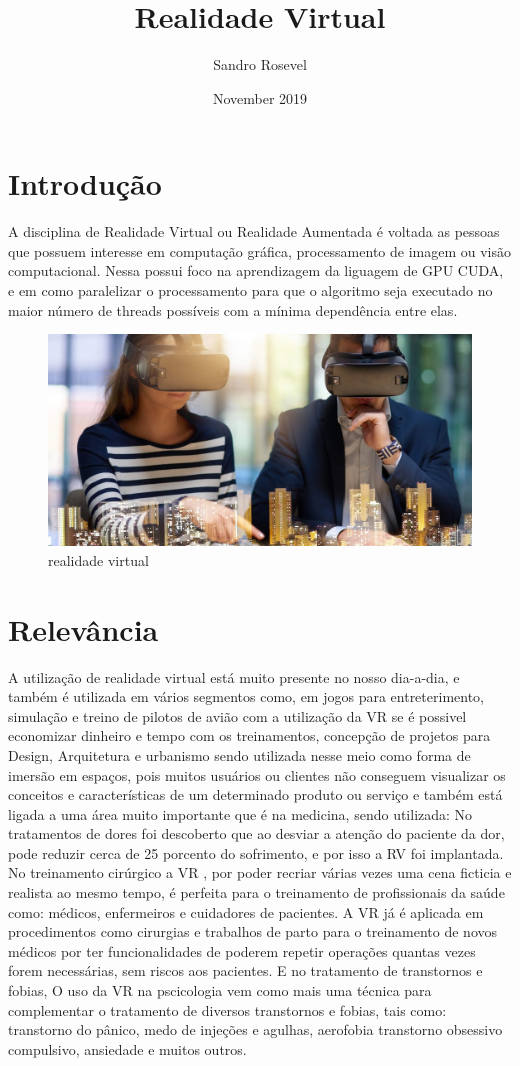 \documentclass{paper}
\title{Realidade Virtual}
\author{Sandro Rosevel}
\date{November 2019}
\begin{document}
\section{Introdução}
A disciplina de Realidade Virtual ou Realidade Aumentada é voltada as pessoas que possuem interesse em computação gráfica, processamento de imagem ou visão computacional.
Nessa possui foco na aprendizagem da liguagem de GPU CUDA, e em como paralelizar o processamento para que o algoritmo seja executado no maior número de threads possíveis com a mínima dependência entre elas.
\begin{figure}[h!]
\centering
\includegraphics[scale=0.2]{realidade-virtual.jpg}
\caption{realidade virtual}
\label{fig:realidade virtual}
\end{figure}
\section{Relevância}
A utilização de realidade virtual está muito presente no nosso dia-a-dia, e também é utilizada em vários segmentos como, em jogos para entreterimento, simulação e treino de pilotos de avião com a utilização da VR se é possivel economizar dinheiro e tempo com os treinamentos, concepção de projetos para Design, Arquitetura e urbanismo sendo utilizada nesse meio como forma de imersão em espaços, pois muitos usuários ou clientes não conseguem visualizar os conceitos e características de um determinado produto ou serviço\citep{arq2019} e também está ligada a uma área muito importante que é na medicina, sendo utilizada: No tratamentos de dores  foi descoberto que ao desviar a atenção do paciente da dor, pode reduzir cerca de 25 porcento do sofrimento, e por isso a RV foi implantada. No treinamento cirúrgico a VR , por poder recriar várias vezes uma cena ficticia e realista ao mesmo tempo, é perfeita para o treinamento de profissionais da saúde como: médicos, enfermeiros e cuidadores de pacientes. A VR já é aplicada em procedimentos como cirurgias e trabalhos de parto para o treinamento de novos médicos por ter funcionalidades de poderem repetir operações quantas vezes forem necessárias, sem riscos aos pacientes. E no tratamento de transtornos e fobias, O uso da VR na pscicologia vem como mais uma técnica para complementar o tratamento de diversos transtornos e fobias, tais como: transtorno do pânico, medo de injeções e agulhas, aerofobia transtorno obsessivo compulsivo, ansiedade e muitos outros.\citep{med2019} \citep{fob2019}
\end{document}
